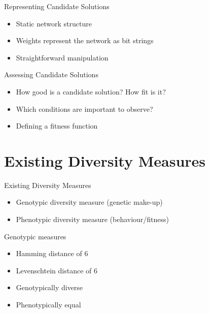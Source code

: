 
\begin{frame}{Representing Candidate Solutions}
    \begin{center}
    \end{center}
      \begin{itemize}
        \item Static network structure
        \item Weights represent the network as bit strings
        \item Straightforward manipulation
      \end{itemize}
\end{frame}

\begin{frame}{Assessing Candidate Solutions}
  \begin{itemize}
    \item How good is a candidate solution? How fit is it?
    \item Which conditions are important to observe?
    \item Defining a fitness function
  \end{itemize}
\end{frame}

\section{Existing Diversity Measures}

\begin{frame}{Existing Diversity Measures}
  \begin{itemize}
    \item Genotypic diversity measure (genetic make-up)
    \item Phenotypic diversity measure (behaviour/fitness)
  \end{itemize}
\end{frame}

\begin{frame}{Genotypic measures}
  

  \begin{itemize}
    \item Hamming distance of 6
    \item Levenschtein distance of 6
    \item Genotypically diverse
    \item Phenotypically equal
  \end{itemize}
\end{frame}

